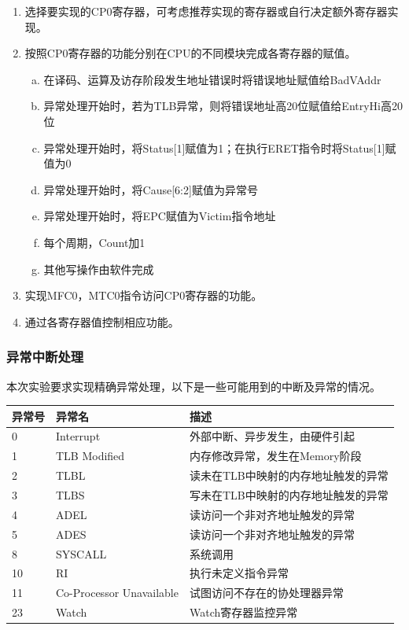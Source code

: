 \begin{enumerate}[(1)]
\item 选择要实现的CP0寄存器，可考虑推荐实现的寄存器或自行决定额外寄存器实现。

\item 按照CP0寄存器的功能分别在CPU的不同模块完成各寄存器的赋值。

\begin{enumerate}[(a)]
\item 在译码、运算及访存阶段发生地址错误时将错误地址赋值给BadVAddr

\item 异常处理开始时，若为TLB异常，则将错误地址高20位赋值给EntryHi高20位

\item 异常处理开始时，将Status[1]赋值为1；在执行ERET指令时将Status[1]赋值为0

\item 异常处理开始时，将Cause[6:2]赋值为异常号

\item 异常处理开始时，将EPC赋值为Victim指令地址

\item 每个周期，Count加1

\item 其他写操作由软件完成 
\end{enumerate}

\item 实现MFC0，MTC0指令访问CP0寄存器的功能。

\item 通过各寄存器值控制相应功能。

\end{enumerate}


\subsubsection{异常中断处理}
本次实验要求实现精确异常处理，以下是一些可能用到的中断及异常的情况。

\begin{table}[H]
\centering
\begin{tabular}{lll}
\hline
异常号&异常名&描述\\
\hline
0&Interrupt&外部中断、异步发生，由硬件引起\\
1&TLB Modified&内存修改异常，发生在Memory阶段\\
2&TLBL&读未在TLB中映射的内存地址触发的异常\\
3&TLBS&写未在TLB中映射的内存地址触发的异常\\
4&ADEL&读访问一个非对齐地址触发的异常\\
5&ADES&读访问一个非对齐地址触发的异常\\
8&SYSCALL&系统调用\\
10&RI&执行未定义指令异常\\
11&Co-Processor Unavailable&试图访问不存在的协处理器异常\\
23&Watch&Watch寄存器监控异常\\
\hline
\end{tabular}
\end{table}

